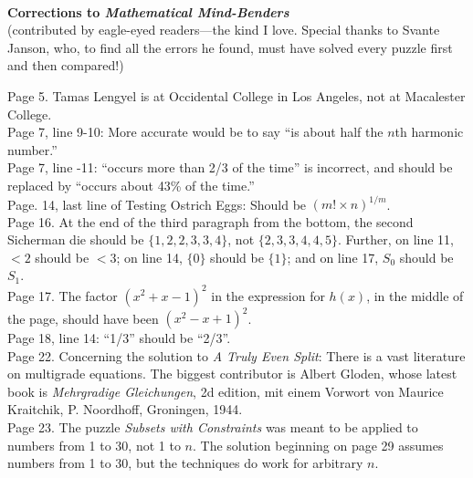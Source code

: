 \documentclass[11pt]{article}
\newlength{\originalbase}
\newcommand{\spacing}[1]{\setlength{\baselineskip}{#1\originalbase}}
\begin{document}
\spacing{1}

~

\begin{center}
{\bf \large Corrections to {\em Mathematical Mind-Benders}}\\[3mm]
(contributed by eagle-eyed readers---the kind I love.  Special
thanks to Svante Janson, who, to find all the errors he found,
must have solved every puzzle first and then compared!)
\end{center}

\bigskip

Page 5. Tamas Lengyel is at Occidental College in Los Angeles,
not at Macalester College.\\

Page 7, line 9-10: More accurate would be to say ``is about
half the $n$th harmonic number.''\\

Page 7, line -11: ``occurs more than 2/3 of the time'' is incorrect,
and should be replaced by ``occurs about 43\% of the time.''\\

Page. 14, last line of Testing Ostrich Eggs: Should be $(m! \times n)^{1/m}$.\\

Page 16. At the end of the third paragraph from the bottom, the
second Sicherman die should be $\{1,2,2,3,3,4\}$, not $\{2,3,3,4,4,5\}$.
Further, on line 11, $<2$ should be $<3$; on line 14,
$\{0\}$ should be $\{1\}$; and on line 17, $S_0$ should be $S_1$.\\

Page 17. The factor $(x^2+x-1)^2$ in the expression for $h(x)$, in the middle
of the page, should have been $(x^2-x+1)^2$.\\

Page 18, line 14: ``1/3'' should be ``2/3''.\\

Page 22. Concerning the solution to {\em A Truly Even Split}:
There is a vast literature on multigrade equations.
The biggest contributor is Albert Gloden, whose latest book
is {\em Mehrgradige Gleichungen}, 2d edition, mit einem Vorwort von Maurice Kraitchik,
P. Noordhoff, Groningen, 1944.\\

Page 23.  The puzzle {\em Subsets with Constraints}
was meant to be applied to numbers from 1 to 30,
not 1 to $n$.  The solution beginning on page 29 assumes
numbers from 1 to 30, but the techniques do work for arbitrary $n$.\\
\end{document}
